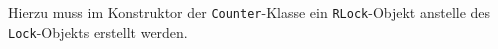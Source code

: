 Hierzu muss im Konstruktor der \lstinline$Counter$-Klasse ein \lstinline$RLock$-Objekt
anstelle des \lstinline$Lock$-Objekts erstellt werden.